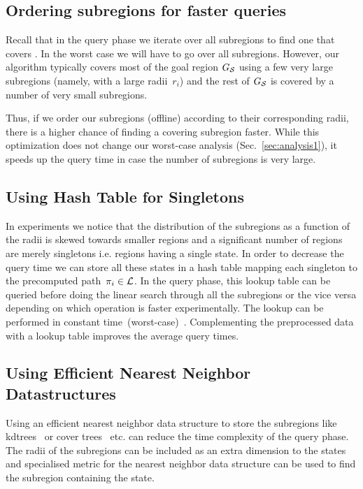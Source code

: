 \documentclass[a4paper]{report}
\begin{document}
\subsection{Ordering subregions for faster queries}
Recall that in the query phase we iterate over all subregions to find one that covers \sGoal. 
In the worst case we will have to go over all subregions.
However,  our algorithm typically covers most of the goal region $G_\mathcal{S}$ using a few very large subregions (namely, with a large radii~$r_i$) and the rest of $G_\mathcal{S}$ is covered by a number of very small subregions.

Thus, if we order our subregions (offline) according to their corresponding radii, there is a higher chance of finding a covering subregion faster. While this optimization does not change our worst-case analysis (Sec.~\ref{sec:analysis1}), it speeds up the query time in case the number of subregions is very large.

\subsection{Using Hash Table for Singletons}
In experiments we notice that the distribution of the subregions as a function of the radii is skewed towards smaller regions and a significant number of regions are merely singletons i.e. regions having a single state. In order to decrease the query time we can store all these states in a hash table mapping each singleton to the precomputed path~$\pi_i \in \mathcal{L}$.  In the query phase, this lookup table can be queried before doing the linear search through all the subregions or the vice versa depending on which operation is faster experimentally. The lookup can be performed in constant time~(worst-case)~\cite{czech1997perfect}. Complementing the preprocessed data with a lookup table improves the average query times.

\subsection{Using Efficient Nearest Neighbor Datastructures}
Using an efficient nearest neighbor data structure to store the subregions like kdtrees~\cite{bentley1975multidimensional} or cover trees~\cite{beygelzimer2006cover} etc. can reduce the time complexity of the query phase. The radii of the subregions can be included as an extra dimension to the states and specialised metric for the nearest neighbor data structure can be used to find the subregion containing the state.
\end{document}
